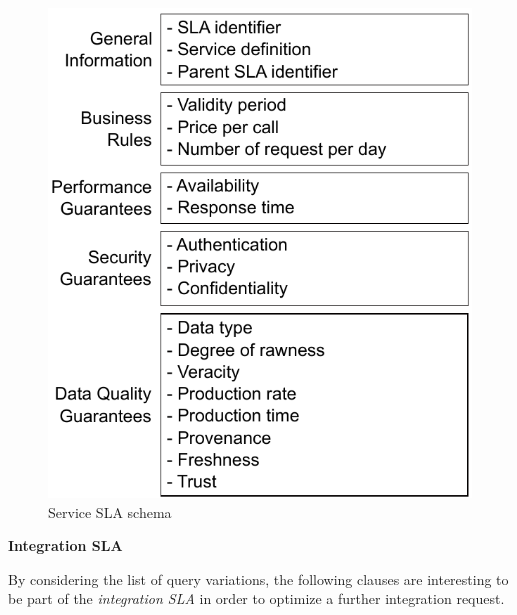 \documentclass[12pt,a4paper,oneside]{article}
\begin{document}
\begin{figure}[h!]
\center
\includegraphics[scale=1]{figures/Service-SLA-Schema.pdf}\caption{Service SLA schema}\label{fig:servicesla}
\end{figure}


\begin{flushleft}
\textbf{Integration SLA}
\end{flushleft}

By considering the list of query variations, the following clauses are interesting to be part of the \textsl{integration SLA} in order to optimize a further integration request. 
\end{document}
